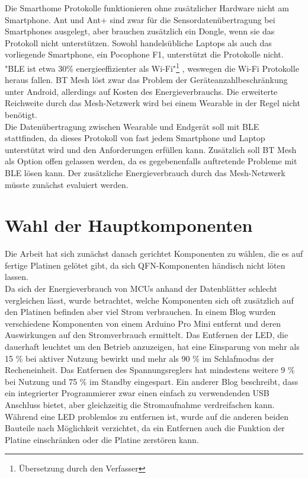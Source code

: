 Die Smarthome Protokolle funktionieren ohne zusätzlicher Hardware nicht am Smartphone.
Ant und Ant+ sind zwar für die Sensordatenübertragung bei Smartphones ausgelegt, aber brauchen zusätzlich ein Dongle, wenn sie das Protokoll nicht unterstützen.
Sowohl handelsübliche Laptops als auch das vorliegende Smartphone, ein Pocophone F1, unterstützt die Protokolle nicht.\\
"BLE ist etwa 30\% energieeffizienter als Wi-Fi"\footnote{Übersetzung durch den Verfasser} \cite{comparison_wifi_ble}, weswegen die Wi-Fi Protokolle heraus fallen.
BT Mesh löst zwar das Problem der Geräteanzahlbeschränkung unter Android, allerdings auf Kosten des Energieverbrauchs.
Die erweiterte Reichweite durch das Mesh-Netzwerk wird bei einem Wearable in der Regel nicht benötigt.\\
Die Datenübertragung zwischen Wearable und Endgerät soll mit BLE stattfinden, da dieses Protokoll von fast jedem Smartphone und Laptop unterstützt wird und den Anforderungen erfüllen kann.
Zusätzlich soll BT Mesh als Option offen gelassen werden, da es gegebenenfalls auftretende Probleme mit BLE lösen kann.
Der zusätzliche Energieverbrauch durch das Mesh-Netzwerk müsste zunächst evaluiert werden.

\section{Wahl der Hauptkomponenten}
Die Arbeit hat sich zunächst danach gerichtet Komponenten zu wählen, die es auf fertige Platinen gelötet gibt, da sich QFN-Komponenten händisch nicht löten lassen.\\
Da sich der Energieverbrauch von MCUs anhand der Datenblätter schlecht vergleichen lässt, wurde betrachtet, welche Komponenten sich oft zusätzlich auf den Platinen befinden aber viel Strom verbrauchen.
In einem Blog \cite{site_arduinolp} wurden verschiedene Komponenten von einem Arduino Pro Mini entfernt und deren Auswirkungen auf den Stromverbrauch ermittelt.
Das Entfernen der LED, die dauerhaft leuchtet um den Betrieb anzuzeigen, hat eine Einsparung von mehr als 15 \% bei aktiver Nutzung bewirkt und mehr als 90 \% im Schlafmodus der Recheneinheit.
Das Entfernen des Spannungsreglers hat mindestens weitere 9 \% bei Nutzung und 75 \% im Standby eingespart.
Ein anderer Blog \cite{site_arduinolp2} beschreibt, dass ein integrierter Programmierer zwar einen einfach zu verwendenden USB Anschluss bietet, aber gleichzeitig die Stromaufnahme verdreifachen kann.
Während eine LED problemlos zu entfernen ist, wurde auf die anderen beiden Bauteile nach Möglichkeit verzichtet, da ein Entfernen auch die Funktion der Platine einschränken oder die Platine zerstören kann.

